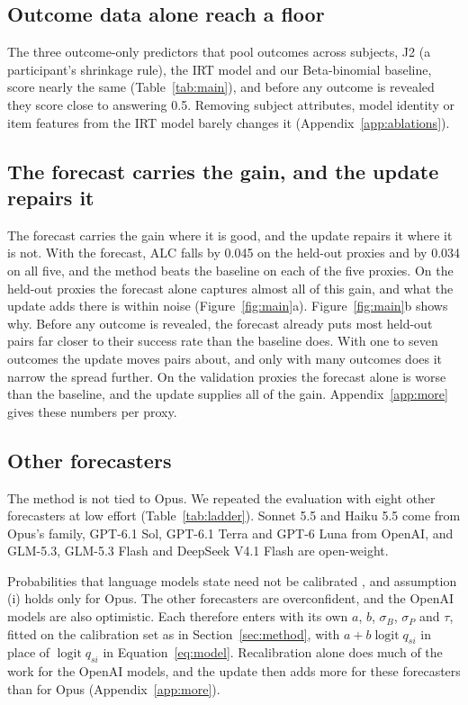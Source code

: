 \documentclass{article}
\newcommand{\logit}{\operatorname{logit}}
\begin{document}
\subsection{Outcome data alone reach a floor}

The three outcome-only predictors that pool outcomes across subjects, J2 (a participant's shrinkage rule), the IRT model and our Beta-binomial baseline, score nearly the same (Table~\ref{tab:main}), and before any outcome is revealed they score close to answering 0.5. Removing subject attributes, model identity or item features from the IRT model barely changes it (Appendix~\ref{app:ablations}).

\subsection{The forecast carries the gain, and the update repairs it}
\label{sec:gain}

The forecast carries the gain where it is good, and the update repairs it where it is not. With the forecast, ALC falls by 0.045 on the held-out proxies and by 0.034 on all five, and the method beats the baseline on each of the five proxies. On the held-out proxies the forecast alone captures almost all of this gain, and what the update adds there is within noise (Figure~\ref{fig:main}a). Figure~\ref{fig:main}b shows why. Before any outcome is revealed, the forecast already puts most held-out pairs far closer to their success rate than the baseline does. With one to seven outcomes the update moves pairs about, and only with many outcomes does it narrow the spread further. On the validation proxies the forecast alone is worse than the baseline, and the update supplies all of the gain. Appendix~\ref{app:more} gives these numbers per proxy.

\subsection{Other forecasters}
\label{sec:ladder}

The method is not tied to Opus. We repeated the evaluation with eight other forecasters at low effort (Table~\ref{tab:ladder}). Sonnet 5.5 and Haiku 5.5 come from Opus's family, GPT-6.1 Sol, GPT-6.1 Terra and GPT-6 Luna from OpenAI, and GLM-5.3, GLM-5.3 Flash and DeepSeek V4.1 Flash are open-weight.

Probabilities that language models state need not be calibrated \cite{tian2023calibration}, and assumption (i) holds only for Opus. The other forecasters are overconfident, and the OpenAI models are also optimistic. Each therefore enters with its own $a$, $b$, $\sigma_B$, $\sigma_P$ and $\tau$, fitted on the calibration set as in Section~\ref{sec:method}, with $a + b \logit q_{si}$ in place of $\logit q_{si}$ in Equation~\eqref{eq:model}. Recalibration alone does much of the work for the OpenAI models, and the update then adds more for these forecasters than for Opus (Appendix~\ref{app:more}).
\end{document}
